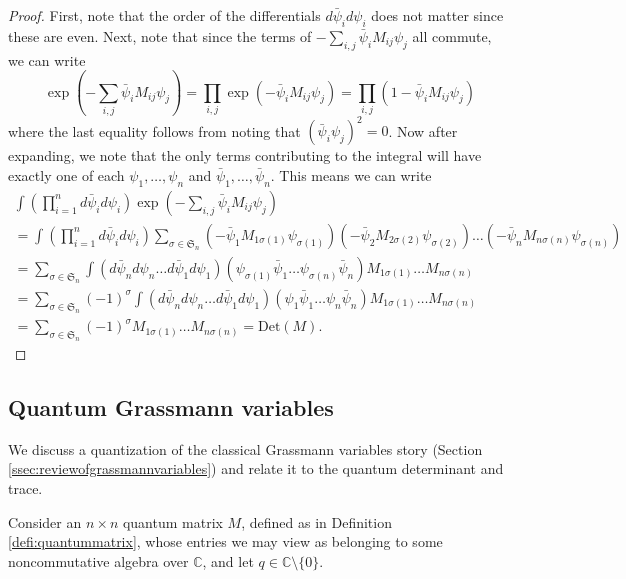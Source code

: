 \documentclass[12pt, reqno]{amsart}
\theoremstyle{definition}
\newcommand{\Det}{\mathrm{Det}}%
\begin{document}
\begin{proof}
First, note that the order of the differentials $d\bar{\psi}_i d{\psi}_i$ does not matter since these are even.  Next, note that since the terms of $-\sum_{i,j} \bar{\psi}_i M_{ij} \psi_j$ all commute, we can write
$$
\exp\left(- \sum_{i,j} \bar{\psi}_i M_{ij} \psi_j\right)
=
\prod_{i,j} \exp( - \bar{\psi}_i M_{ij} \psi_j )
=
\prod_{i,j} ( 1 - \bar{\psi}_i M_{ij} \psi_j )
$$
where the last equality follows from noting that $(\bar{\psi}_i \psi_j )^2 = 0$. Now after expanding, we note that the only terms contributing to the integral will have exactly one of each $\psi_1,\dots,\psi_n$ and $\bar{\psi}_1,\dots,\bar{\psi}_n$. This means we can write 
\begin{gather*}
\int 
\left( \prod_{i=1}^{n} d\bar{\psi}_i d{\psi}_i \right) 
\exp\left(- \sum_{i,j} \bar{\psi}_i M_{ij} \psi_j\right)
\\
= 
\int 
\left( \prod_{i=1}^{n} d\bar{\psi}_i d{\psi}_i \right) 
\sum_{\sigma \in \mathfrak{S}_n}
( - \bar{\psi}_1 M_{1 \sigma(1)} \psi_{\sigma(1)} ) 
( - \bar{\psi}_2 M_{2 \sigma(2)} \psi_{\sigma(2)} ) 
\dots
( - \bar{\psi}_n M_{n \sigma(n)} \psi_{\sigma(n)} )
\\
= 
\sum_{\sigma \in \mathfrak{S}_n} 
\int 
( d\bar{\psi}_n d{\psi}_n \dots  d\bar{\psi}_1 d{\psi}_1 ) 
( \psi_{\sigma(1)} \bar{\psi}_1  \dots \psi_{\sigma(n)} \bar{\psi}_n )
M_{1 \sigma(1)} \dots M_{n \sigma(n)}
\\
= 
\sum_{\sigma \in \mathfrak{S}_n} (-1)^{\sigma}
\int 
( d\bar{\psi}_n d{\psi}_n \dots  d\bar{\psi}_1 d{\psi}_1 ) 
( \psi_{1} \bar{\psi}_1  \dots \psi_{n} \bar{\psi}_n )
M_{1 \sigma(1)} \dots M_{n \sigma(n)}
\\
= 
\sum_{\sigma \in \mathfrak{S}_n} (-1)^{\sigma}
M_{1 \sigma(1)} \dots M_{n \sigma(n)}
= \Det(M).
\end{gather*}
\end{proof}

\subsection{Quantum Grassmann variables}

We discuss a quantization of the classical Grassmann variables story (Section \ref{ssec:reviewofgrassmannvariables}) and relate it to the quantum determinant and trace.

Consider an $n \times n$ quantum matrix $M$, defined as in Definition \ref{defi:quantummatrix}, whose entries we may view as belonging to some noncommutative algebra over $\mathbb{C}$, and let $q \in \mathbb{C}\setminus\{0\}$.
\end{document}
